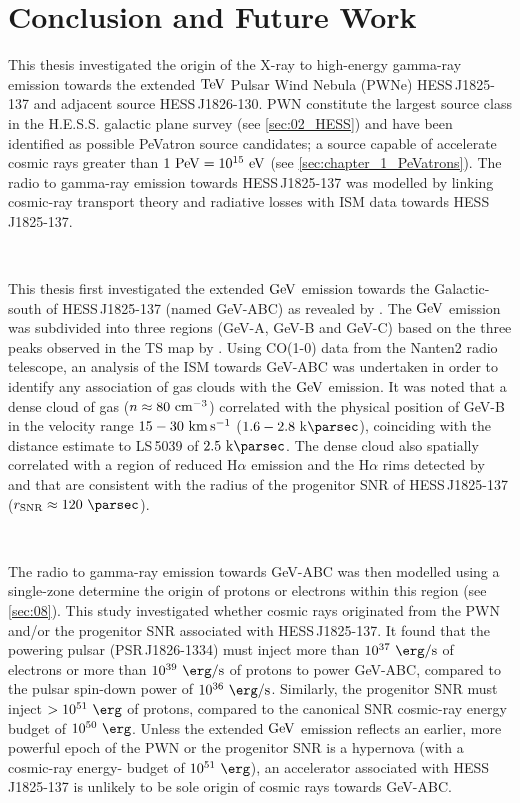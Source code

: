 \chapter{Conclusion and Future Work} \label{sec:10_summary}

This thesis investigated the origin of the X-ray to high-energy gamma-ray emission towards the extended $\TeV$ Pulsar Wind Nebula (PWNe) \mbox{HESS\,J1825-137} and adjacent source \mbox{HESS\,J1826-130}. PWN constitute the largest source class in the H.E.S.S. galactic plane survey (see \autoref{sec:02_HESS}) and have been identified as possible PeVatron source candidates; a source capable of accelerate cosmic rays greater than $1~\PeV=10^{15}~\eV$ (see \autoref{sec:chapter_1_PeVatrons}). The radio to gamma-ray emission towards \mbox{HESS\,J1825-137} was modelled by linking cosmic-ray transport theory and radiative losses with ISM data towards \mbox{HESS\,J1825-137}.
\par~\par
This thesis first investigated the extended $\si{\giga\electronvolt}$ emission towards the Galactic-south of \mbox{HESS\,J1825-137} (named GeV-ABC) as revealed by \cite{2019MNRAS.485.1001A}. The $\si{\giga\electronvolt}$ emission was subdivided into three regions (GeV-A, GeV-B and GeV-C) based on the three peaks observed in the TS map by \cite{2019MNRAS.485.1001A}. Using CO(1-0) data from the Nanten2 radio telescope, an analysis of the ISM towards GeV-ABC was undertaken in order to identify any association of gas clouds with the $\si{\giga\electronvolt}$ emission. It was noted that a dense cloud of gas ($n\approx 80~\si{\per\centi\meter\cubed}$) correlated with the physical position of GeV-B in the velocity range $15-30~\si{\kilo\meter\per\second}$ ($1.6-2.8~\kpc$), coinciding with the distance estimate to \mbox{LS\,5039} of $2.5~\kpc$. The dense cloud also spatially correlated with a region of reduced H$\alpha$ emission and the H$\alpha$ rims detected by \cite{2008MNRAS.390.1037S} and \cite{2016MNRAS.458.2813V} that are consistent with the radius of the progenitor SNR of \mbox{HESS\,J1825-137} ($r_\text{SNR}\approx 120~\pc$).
\par~\par
The radio to gamma-ray emission towards \mbox{GeV-ABC} was then modelled using a single-zone determine the origin of protons or electrons within this region (see \autoref{sec:08}). This study investigated whether cosmic rays originated from the PWN and/or the progenitor SNR associated with \mbox{HESS\,J1825-137}. It found that the powering pulsar (\mbox{PSR\,J1826-1334}) must inject more than {$10^{37}~\ergspersec$} of electrons or more than $10^{39}~\ergspersec$ of protons to power \mbox{GeV-ABC}, compared to the pulsar spin-down power of $10^{36}~\ergspersec$. Similarly, the progenitor SNR must inject $>10^{51}~\ergs$ of protons, compared to the canonical SNR cosmic-ray energy budget of $10^{50}~\ergs$. Unless the extended $\si{\giga\electronvolt}$ emission reflects an earlier, more powerful epoch of the PWN or the progenitor SNR is a hypernova (with a cosmic-ray energy- budget of $10^{51}~\ergs$), an accelerator associated with \mbox{HESS\,J1825-137} is unlikely to be sole origin of cosmic rays towards \mbox{GeV-ABC}.
